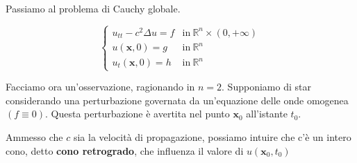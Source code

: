 \documentclass[10pt,a4paper,twoside,openright]{book}
\newcommand{\x}{\mathbf{x}}
\begin{document}
Passiamo al problema di Cauchy globale.

\begin{equation}
    \begin{cases}
        u_{tt} -c^{2} \Delta u=f & \text{in} \ \mathbb{R}^{n} \times (0,+\infty) \\
        u(\x ,0) =g              & \text{in} \ \mathbb{R}^{n}                    \\
        u_{t}(\x ,0) =h          & \text{in} \ \mathbb{R}^{n}
    \end{cases}
    \label{eq:pcg-onde-unicita}
\end{equation}

Facciamo ora un'osservazione, ragionando in $n=2$. Supponiamo di star considerando una perturbazione governata da un'equazione delle onde omogenea $(f\equiv 0)$. Questa perturbazione è avertita nel punto $\x_{0}$ all'istante $t_{0}$.

Ammesso che $c$ sia la velocità di propagazione, possiamo intuire che c'è un intero cono, detto \textbf{cono retrogrado}, che influenza il valore di $u(\x_{0} ,t_{0})$

\end{document}
